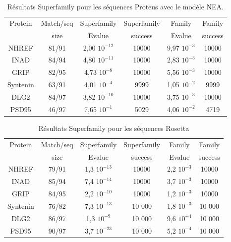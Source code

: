 \begin{table}[h]
       \centering
  \caption{Résultats Superfamily pour les séquences Proteus avec le modèle NEA.}   
  \label{tab:superfamily_model_B6}         
  \begin{tabular}{cccccc}
    
    \toprule
    Protein & Match/seq & Superfamily & Superfamily & Family & Family \\
            & size      & Evalue      & success     & Evalue & success\\
    \cmidrule{1-6}
    NHREF  & 81/91 &     2,00 $10^{-12}$ & 10000  & 9,97 $10^{-3}$ & 10000  \\
    INAD  & 84/94 &      4,80 $10^{-11}$ & 10000  & 2,83 $10^{-3}$ & 10000  \\
    GRIP  & 82/95 &      4,73 $10^{-8}$  & 10000  & 5,56 $10^{-3}$ & 10000  \\
    Syntenin  & 63/91 &  4,01 $10^{-4}$  &  9999  & 1,05 $10^{-2}$ &  9999  \\
    DLG2  & 84/97 &      3,82 $10^{-10}$ & 10000  & 3,75 $10^{-3}$ & 10000  \\
    PSD95  & 46/97 &     7,65 $10^{-1}$  &  5029  & 4,06 $10^{-2}$ &  4719  \\

    \bottomrule        
  \end{tabular}   
\end{table}
\begin{table}[h]

  \begin{tabular}{cccccc}
    \centering
    \caption{Résultats Superfamily pour les séquences Rosetta}   
    \label{tab:superfamily_bestRE}       
    \toprule
    Protein & Match/seq & Superfamily & Superfamily & Family & Family \\
            & size      & Evalue      & success     & Evalue & success\\
    \cmidrule{1-6}
    NHREF    & 79/91   &    1,3 $10^{-13}$ & 10000 & 2,2 $10^{-3}$ & 10000 \\
    INAD     & 85/94   &    7,4 $10^{-14}$ & 10000 & 3,7 $10^{-3}$ & 10000 \\
    GRIP     & 84/95   &    2,2 $10^{-10}$ & 10000 & 1,2 $10^{-3}$ & 10000 \\
    Syntenin & 76/82   &    7,3 $10^{-13}$ & 10 000 & 1,8 $10^{-3}$ & 10 000 \\
    DLG2     & 86/97   &    1,3 $10^{-9}$  & 10 000 & 9,6 $10^{-4}$ & 10 000 \\
    PSD95    & 90/97   &    3,7 $10^{-23}$ & 10 000 & 5,2 $10^{-4}$ & 10 000 \\
    \bottomrule        
  \end{tabular}   
\end{table}

